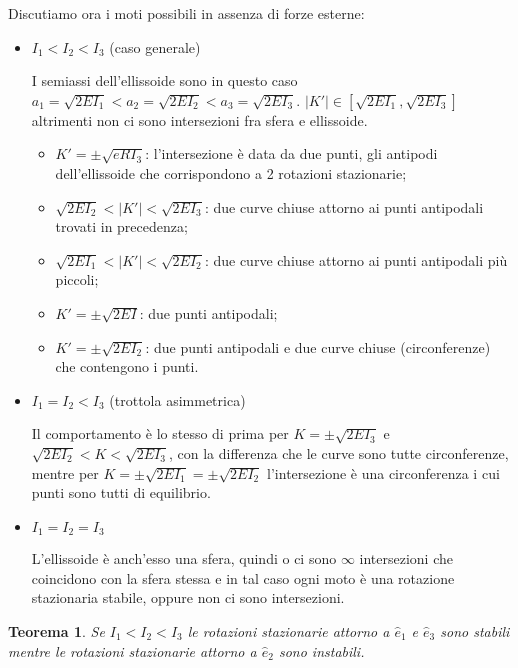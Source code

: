 \documentclass{book}
\theoremstyle{plain}
\newtheorem{teo}{Teorema}[chapter]
\theoremstyle{plain}
\theoremstyle{plain}
\theoremstyle{plain}
\theoremstyle{plain}
\theoremstyle{definition}
\theoremstyle{remark}
\theoremstyle{definition}
\begin{document}
\noindent Discutiamo ora i moti possibili in assenza di forze esterne:
\begin{itemize}
    \item $I_1<I_2<I_3$ (caso generale)

    I semiassi dell'ellissoide sono in questo caso $a_1=\sqrt{2EI_1}<a_2=\sqrt{2EI_2}<a_3=\sqrt{2EI_3}$. $|K'|\in\left[\sqrt{2EI_1},\sqrt{2EI_3}\right]$ altrimenti non ci sono intersezioni fra sfera e ellissoide.
    \begin{itemize}
        \item $K'=\pm\sqrt{eRI_3}$: l'intersezione è data da due punti, gli antipodi dell'ellissoide che corrispondono a 2 rotazioni stazionarie;
        \item $\sqrt{2EI_2}<|K'|<\sqrt{2EI_3}$: due curve chiuse attorno ai punti antipodali trovati in precedenza;
        \item $\sqrt{2EI_1}<|K'|<\sqrt{2EI_2}$: due curve chiuse attorno ai punti antipodali più piccoli;
        \item $K'=\pm\sqrt{2EI}$: due punti antipodali;
        \item $K'=\pm\sqrt{2EI_2}$: due punti antipodali e due curve chiuse (circonferenze) che contengono i punti.
    \end{itemize}
    \item $I_1=I_2<I_3$ (trottola asimmetrica)

    Il comportamento è lo stesso di prima per $K=\pm\sqrt{2EI_3}$ e $\sqrt{2EI_2}<K<\sqrt{2EI_3}$, con la differenza che le curve sono tutte circonferenze, mentre per $K=\pm\sqrt{2EI_1}=\pm\sqrt{2EI_2}$ l'intersezione è una circonferenza i cui punti sono tutti di equilibrio.
    \item $I_1=I_2=I_3$
    
    L'ellissoide è anch'esso una sfera, quindi o ci sono $\infty$ intersezioni che coincidono con la sfera stessa e in tal caso ogni moto è una rotazione stazionaria stabile, oppure non ci sono intersezioni.
\end{itemize}

\begin{teo}
    Se $I_1<I_2<I_3$ le rotazioni stazionarie attorno a $\hat{e}_1$ e $\hat{e}_3$ sono stabili mentre le rotazioni stazionarie attorno a $\hat{e}_2$ sono instabili.
\end{teo}
\end{document}
